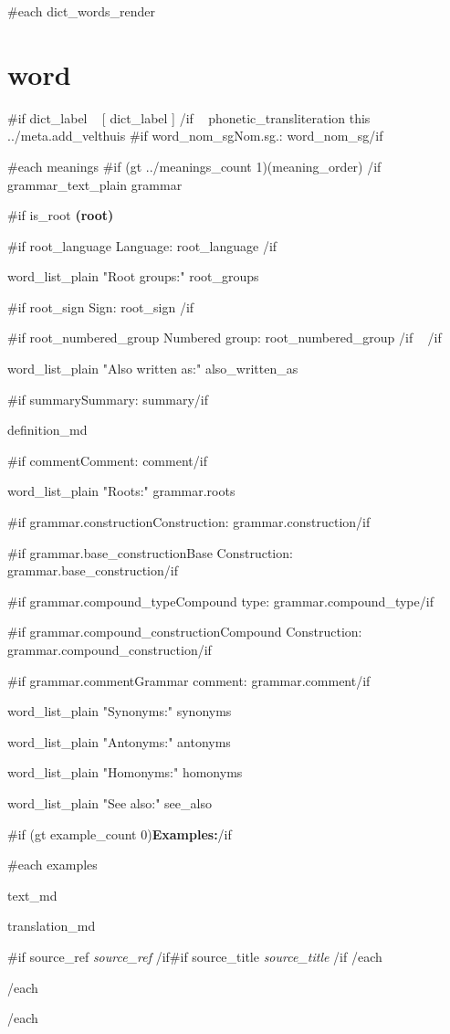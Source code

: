 \documentclass[11pt, a4paper, landscape, oneside, twocolumn]{memoir}
\begin{document}
{\raggedright

{{#each dict_words_render}}

\section{%
{{word}}%
}

{{#if dict_label ~}}
[%
{{dict_label}}%
]
{{/if ~}}
{{phonetic_transliteration this ../meta.add_velthuis}}
{{#if word_nom_sg}}Nom.sg.: {{word_nom_sg}}{{/if}}

{{#each meanings}}
{{#if (gt ../meanings_count 1)}}({{meaning_order}}) {{/if}} {{grammar_text_plain grammar}}

{{#if is_root}}
\textbf{(root)}

{{#if root_language}}
Language: {{root_language}}
{{/if ~}}

{{word_list_plain "Root groups:" root_groups ~}}

{{#if root_sign}}
Sign: {{root_sign}}
{{/if ~}}

{{#if root_numbered_group}}
Numbered group: {{root_numbered_group}}
{{/if ~}}
{{/if ~}}

{{word_list_plain "Also written as:" also_written_as}}

{{#if summary}}Summary: {{summary}}{{/if}}

{{definition_md}}

{{#if comment}}Comment: {{comment}}{{/if}}

{{word_list_plain "Roots:" grammar.roots}}

{{#if grammar.construction}}Construction: {{grammar.construction}}{{/if}}

{{#if grammar.base_construction}}Base Construction: {{grammar.base_construction}}{{/if}}

{{#if grammar.compound_type}}Compound type: {{grammar.compound_type}}{{/if}}

{{#if grammar.compound_construction}}Compound Construction: {{grammar.compound_construction}}{{/if}}

{{#if grammar.comment}}Grammar comment: {{grammar.comment}}{{/if}}

{{word_list_plain "Synonyms:" synonyms}}

{{word_list_plain "Antonyms:" antonyms}}

{{word_list_plain "Homonyms:" homonyms}}

{{word_list_plain "See also:" see_also}}

{{#if (gt example_count 0)}}\textbf{Examples:}{{/if}}

{{#each examples}}

{{text_md}}

{{translation_md}}

{{#if source_ref}}
\textit{%
{{source_ref}}%
}{{/if}}{{#if source_title}}
\textit{%
 {{source_title}}%
}
{{/if}}
{{/each}}

{{/each}}

{{/each}}%

}%

\end{document}
